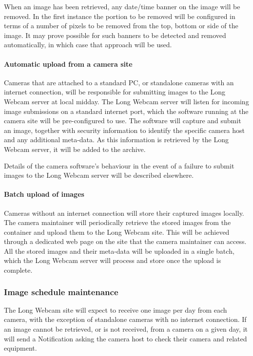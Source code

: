 \documentclass[11pt]{article}
\begin{document}
When an image has been retrieved, any date/time banner on the image will be removed. In the first instance the portion to be removed will be configured in terms of a number of pixels to be removed from the top, bottom or side of the image. It may prove possible for such banners to be detected and removed automatically, in which case that approach will be used.

\paragraph{Automatic upload from a camera site}
Cameras that are attached to a standard PC, or standalone cameras with an internet connection, will be responsible for submitting images to the Long Webcam server at local midday. The Long Webcam server will listen for incoming image submissions on a standard internet port, which the software running at the camera site will be pre-configured to use. The software will capture and submit an image, together with security information to identify the specific camera host and any additional meta-data. As this information is retrieved by the Long Webcam server, it will be added to the archive.

Details of the camera software's behaviour in the event of a failure to submit images to the Long Webcam server will be described elsewhere.

\paragraph{Batch upload of images}
Cameras without an internet connection will store their captured images locally. The camera maintainer will periodically retrieve the stored images from the container and upload them to the Long Webcam site. This will be achieved through a dedicated web page on the site that the camera maintainer can access. All the stored images and their meta-data will be uploaded in a single batch, which the Long Webcam server will process and store once the upload is complete.

\subsubsection{Image schedule maintenance}
The Long Webcam site will expect to receive one image per day from each camera, with the exception of standalone cameras with no internet connection. If an image cannot be retrieved, or is not received, from a camera on a given day, it will send a Notification asking the camera host to check their camera and related equipment.
\end{document}

